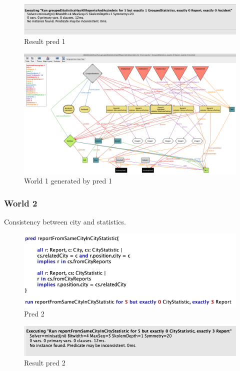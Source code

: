 \begin{figure}[h]
	\centering
	\includegraphics[width=0.9\linewidth, height=0.12\textheight]{Images/Alloy/test-world12}
	\caption{Result pred 1}
	\label{Result pred 1}
\end{figure}
\begin{figure}[h]
	\centering
	\includegraphics[width=0.9\linewidth, height=0.5\textheight]{Images/Alloy/world1}
	\caption{World 1 generated by pred 1}
	\label{World1 }
\end{figure}
\FloatBarrier
\subsubsection{World 2}
Consistency between city and statistics.
\begin{figure}[h]
	\centering
	\includegraphics[width=0.9\linewidth, height=0.15\textheight]{Images/Alloy/test-world21}
	\caption{Pred 2}
	\label{Pred 2}
\end{figure}

\begin{figure}[h]
	\centering
	\includegraphics[width=0.9\linewidth, height=0.11\textheight]{Images/Alloy/test-world22}
	\caption{Result pred 2}
	\label{Result pred 2}
\end{figure}


